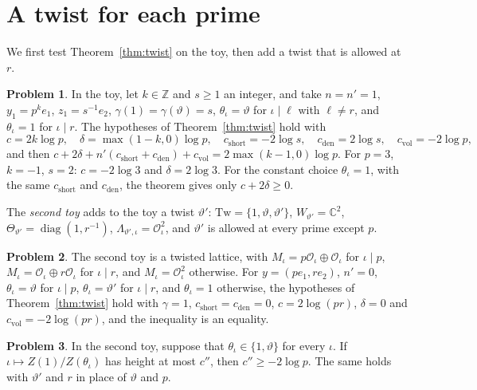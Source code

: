 \documentclass[reqno]{amsart}
\theoremstyle{definition}
\newtheorem{problem}{Problem}[section]
\theoremstyle{plain}
\theoremstyle{remark}
\newcommand{\Z}{\mathbb{Z}}
\newcommand{\C}{\mathbb{C}}
\newcommand{\Oc}{\mathcal{O}}
\newcommand{\diag}{\operatorname{diag}}
\newcommand{\cvol}{c_{\mathrm{vol}}}
\newcommand{\cshort}{c_{\mathrm{short}}}
\newcommand{\cden}{c_{\mathrm{den}}}
\begin{document}
\section{A twist for each prime}\label{sec:each}

We first test Theorem~\ref{thm:twist} on the toy, then add a twist that is allowed at \(r\).

\begin{problem}\label{pr:toy-check}
In the toy, let \(k \in \Z\) and \(s \ge 1\) an integer, and take \(n = n' = 1\), \(y_1 = p^k e_1\), \(z_1 = s^{-1} e_2\), \(\gamma(1) = \gamma(\vartheta) = s\), \(\theta_\iota = \vartheta\) for \(\iota \mid \ell\) with \(\ell \ne r\), and \(\theta_\iota = 1\) for \(\iota \mid r\).  The hypotheses of Theorem~\ref{thm:twist} hold with
\[
  c = 2k \log p, \quad \delta = \max(1 - k, 0) \log p, \quad \cshort = -2\log s, \quad \cden = 2 \log s, \quad \cvol = -2 \log p ,
\]
and then \(c + 2\delta + n'(\cshort + \cden) + \cvol = 2\max(k - 1, 0) \log p\).  For \(p = 3\), \(k = -1\), \(s = 2\): \(c = -2\log 3\) and \(\delta = 2 \log 3\).  For the constant choice \(\theta_\iota = 1\), with the same \(\cshort\) and \(\cden\), the theorem gives only \(c + 2\delta \ge 0\).
\end{problem}

The \emph{second toy} adds to the toy a twist \(\vartheta'\): \(\mathrm{Tw} = \{1, \vartheta, \vartheta'\}\), \(W_{\vartheta'} = \C^2\), \(\Theta_{\vartheta'} = \diag(1, r^{-1})\), \(\Lambda_{\vartheta', \iota} = \Oc_\iota^2\), and \(\vartheta'\) is allowed at every prime except \(p\).

\begin{problem}\label{pr:two-twists}
The second toy is a twisted lattice, with \(M_\iota = p\Oc_\iota \oplus \Oc_\iota\) for \(\iota \mid p\), \(M_\iota = \Oc_\iota \oplus r\Oc_\iota\) for \(\iota \mid r\), and \(M_\iota = \Oc_\iota^2\) otherwise.  For \(y = (p e_1, r e_2)\), \(n' = 0\), \(\theta_\iota = \vartheta\) for \(\iota \mid p\), \(\theta_\iota = \vartheta'\) for \(\iota \mid r\), and \(\theta_\iota = 1\) otherwise, the hypotheses of Theorem~\ref{thm:twist} hold with \(\gamma = 1\), \(\cshort = \cden = 0\), \(c = 2\log(pr)\), \(\delta = 0\) and \(\cvol = -2\log(pr)\), and the inequality is an equality.
\end{problem}

\begin{problem}\label{pr:no-single}
In the second toy, suppose that \(\theta_\iota \in \{1, \vartheta\}\) for every \(\iota\).  If \(\iota \mapsto Z(1)/Z(\theta_\iota)\) has height at most \(c''\), then \(c'' \ge -2\log p\).  The same holds with \(\vartheta'\) and \(r\) in place of \(\vartheta\) and \(p\).
\end{problem}
\end{document}
